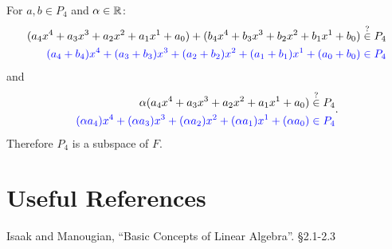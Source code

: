 For $a,b \in P_4$ and $\alpha\in\operatorname{\mathbb{R}}$:
\[\begin{aligned} (a_4x^4 + a_3x^3 + a_2x^2 + a_1x^1 + a_0) + (b_4x^4 + b_3x^3 + b_2x^2 + b_1x^1 + b_0) & \stackrel{?}{\in}  P_4\\
\color{blue}(a_4+b_4)x^4 + (a_3+b_3)x^3 + (a_2+b_2)x^2 + (a_1+b_1)x^1 + (a_0+b_0)  &\color{blue}\in  P_4\end{aligned}\]
and
\[\begin{aligned} \alpha(a_4x^4 + a_3x^3 + a_2x^2 + a_1x^1 + a_0) & \stackrel{?}{\in}  P_4\\
\color{blue}(\alpha a_4)x^4 + (\alpha a_3)x^3 + (\alpha a_2)x^2 + (\alpha a_1)x^1 + (\alpha a_0)  &\color{blue}\in  P_4\end{aligned}.\]
Therefore $P_4$ is a subspace of $F$. 




\section*{Useful References}
Isaak and Manougian, ``Basic Concepts of Linear Algebra''. \S 2.1-2.3\\

